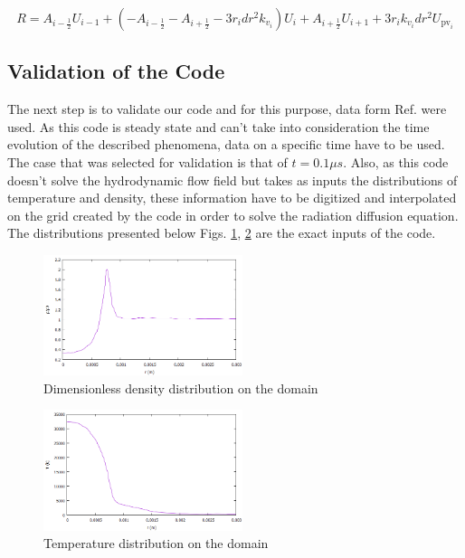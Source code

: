 \documentclass{warpdoc}
\begin{document}
\begin{equation}
  R=A_{i-\frac{1}{2}}U_{i-1}+\left(-A_{i-\frac{1}{2}}-A_{i+\frac{1}{2}}-3r_idr^2k_{v_i}\right)U_i+A_{i+\frac{1}{2}}U_{i+1}+3r_ik_{v_i}dr^2U_{\text{pv}_i}\label{eq:res}
\end{equation}

\subsection{Validation of the Code}
The next step is to validate our code and for this purpose, data form Ref. \cite{shneider} were used. As this code is steady state and can't take into consideration the time evolution of the described phenomena, data on a specific time have to be used. The case that was selected for validation is that of $t=0.1\mu s$. Also, as this code doesn't solve the hydrodynamic flow field but takes as inputs the distributions of temperature and density, these information have to be digitized and interpolated on the grid created by the code in order to solve the radiation diffusion equation. The distributions presented below Figs. \ref{fig:rho}, \ref{fig:T} are the exact inputs of the code.

\begin{figure}[!h]
\centering
\includegraphics[width=0.52\textwidth]{rho.png}
\caption{Dimensionless density distribution on the domain}
\label{fig:rho}
\end{figure}
\begin{figure}[!h]
\centering
\includegraphics[width=0.52\textwidth]{T.png}
\caption{Temperature distribution on the domain}
\label{fig:T}
\end{figure}

\vspace{150mm}




  


 
\end{document}
